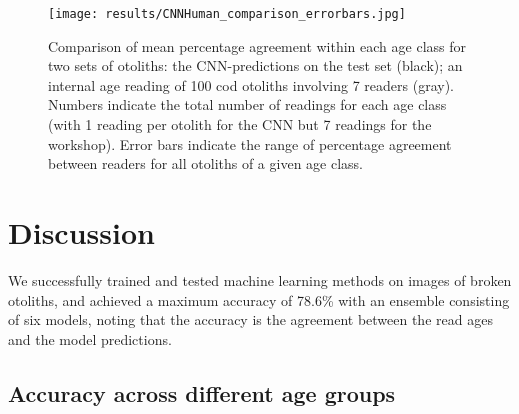 \documentclass[10pt,letterpaper]{article}
\begin{document}
\begin{figure}[hbt!]
  \centering
  \texttt{[image: results/CNNHuman\_comparison\_errorbars.jpg]}
    \caption{Comparison of mean percentage agreement within each age class for two sets of otoliths: the CNN-predictions on the test set (black); an internal age reading of 100 cod otoliths involving 7 readers (gray). Numbers indicate the total number of readings for each age class (with 1 reading per otolith for the CNN but 7 readings for the workshop). Error bars indicate the range of percentage agreement between readers for all otoliths of a given age class.}
  \label{marker19}    
\end{figure}

\section{Discussion}
We successfully trained and tested machine learning methods on images of broken otoliths, and achieved a maximum accuracy of 78.6\% with an ensemble consisting of six models, noting that the accuracy is the agreement between the read ages and the model predictions. 

\subsection{Accuracy across different age groups}
\end{document}
